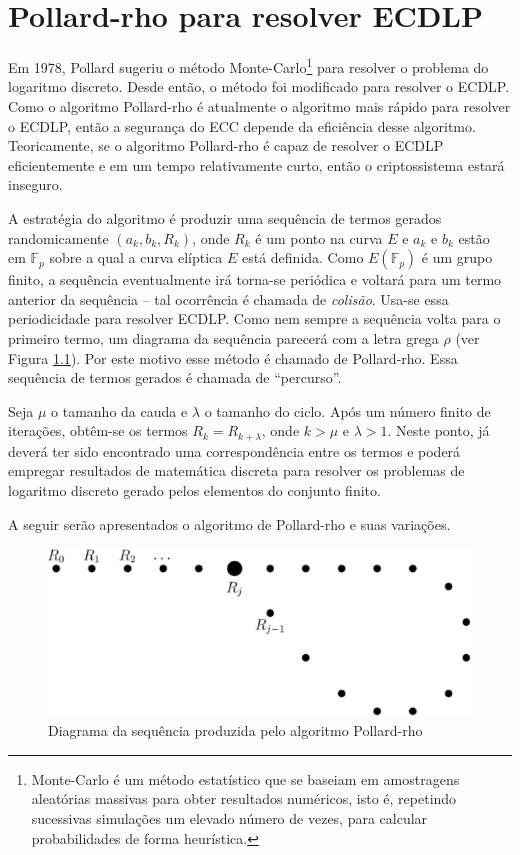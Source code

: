 \chapter{Pollard-rho para resolver ECDLP} \label{PR}
Em 1978, Pollard sugeriu o método Monte-Carlo\footnote{Monte-Carlo é um método estatístico que se baseiam em amostragens aleatórias massivas para obter resultados numéricos, isto é, repetindo sucessivas simulações um elevado número de vezes, para calcular probabilidades de forma heurística.} para resolver o problema do logaritmo discreto. Desde então, o método foi modificado para resolver o ECDLP. Como o algoritmo Pollard-rho é atualmente o algoritmo mais rápido para resolver o ECDLP, então a segurança do ECC depende da eficiência desse algoritmo. Teoricamente, se o algoritmo Pollard-rho é capaz de resolver o ECDLP eficientemente e em um tempo relativamente curto, então o criptossistema estará inseguro. \cite{Mandy:2007}

A estratégia do algoritmo é produzir uma sequência de termos gerados randomicamente $(a_k, b_k, R_k)$, onde \(R_k\) é um ponto na curva \(E\) e \(a_k\)  e \(b_k\) estão em $\mathbb{F}_p$ sobre a qual a curva elíptica \(E\) está definida. Como $E(\mathbb{F}_p)$ é um grupo finito, a sequência eventualmente irá torna-se periódica e voltará para um termo anterior da sequência \--- tal ocorrência é chamada de \textit{colisão}. Usa-se essa periodicidade para resolver ECDLP. Como nem sempre a sequência volta para o primeiro termo, um diagrama da sequência parecerá com a letra grega \(\rho\) (ver Figura \ref{fig:rho}). Por este motivo esse método é chamado de Pollard-rho. Essa sequência de termos gerados é chamada de ``percurso''.

Seja \(\mu\) o tamanho da cauda e \(\lambda\) o tamanho do ciclo. Após um número finito de iterações, obtêm-se os termos $R_k = R_{k+\lambda}$, onde $k > \mu$ e $\lambda > 1$. Neste ponto, já deverá ter sido encontrado uma correspondência entre os termos e poderá empregar resultados de matemática discreta para resolver os problemas de logaritmo discreto gerado pelos elementos do conjunto finito.

A seguir serão apresentados o algoritmo de Pollard-rho e suas variações.

\begin{figure}[h]
\centering
\includegraphics[scale=0.4, bb=0 0 888 376]{figuras/rho.eps}
\caption{Diagrama da sequência produzida pelo algoritmo Pollard-rho}
\label{fig:rho}
\end{figure}

